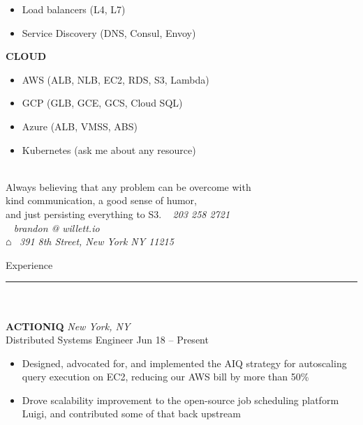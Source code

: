 \documentclass[letterpaper]{article}
\begin{document}
\begin{bgbox}[height=\paperheight, colback=gray!15, width=0.38\textwidth, left=0.12in, right=0.11in]
\begin{itemize} [noitemsep,topsep=4pt]
			\item Load balancers (L4, L7)
			\item Service Discovery (DNS, Consul, Envoy)
		\end{itemize}
		\vspace*{12pt}
		\textbf{CLOUD}
		\begin{itemize} [noitemsep,topsep=4pt]
			\item AWS (ALB, NLB, EC2, RDS, S3, Lambda)
			\item GCP (GLB, GCE, GCS, Cloud SQL)
			\item Azure (ALB, VMSS, ABS)
			\item Kubernetes (ask me about any resource)
		\end{itemize}
	\end{bgbox}%
	\begin{bgbox}[height=\paperheight, colback=white, width=0.62\textwidth]
		\vspace*{9pt}
		\begin{bgbox}[height=1.60in, colback=gray!15, width=\textwidth, top=0.05in]
			\\
			Always believing that any problem can be overcome with \\
			kind communication, a good sense of humor, \\
			and just persisting everything to S3. \hfill {\large\Telefon}~ \textit{203 258 2721} \\
			\null \hfill {\large\Letter}~ \textit{brandon @ willett.io } \\
			\null \hfill $\house$~ \textit{391 8th Street, New York NY 11215}
		\end{bgbox}\vspace*{25.5pt}
		{\Huge{Experience}}\\[-6pt]
		\noindent\rule{\textwidth}{1pt}\\ \\
		\textbf{ACTIONIQ} \hfill \textit{New York, NY}\\
		Distributed Systems Engineer \hfill Jun 18 -- Present
		\begin{itemize} [noitemsep,topsep=4pt]
			\item Designed, advocated for, and implemented the AIQ strategy for autoscaling query execution on EC2, reducing our AWS bill by more than 50\%
			\item Drove scalability improvement to the open-source job scheduling platform Luigi, and contributed some of that back upstream

\end{itemize}
\end{bgbox}
\end{document}
